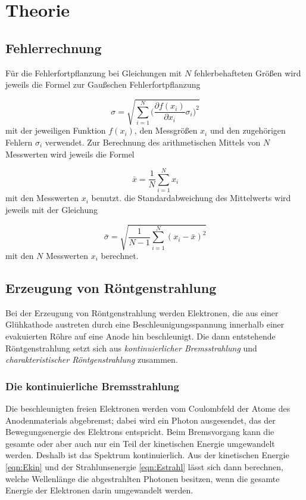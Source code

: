 \section{Theorie}
\label{sec:Theorie}

\subsection{Fehlerrechnung}

Für die Fehlerfortpflanzung bei Gleichungen mit $N$ fehlerbehafteten Größen
wird jeweils die Formel zur Gaußschen Fehlerfortpflanzung

\begin{equation}
  \sigma = \sqrt{\sum_{i=1}^{N}\biggl(\frac{\partial f(x_i)}{\partial x_i}
  \sigma_i\biggr)^2}
\end{equation}
mit der jeweiligen Funktion $f(x_i)$, den Messgrößen $x_i$ und den
zugehörigen Fehlern $\sigma_i$ verwendet.
Zur Berechnung des arithmetischen Mittels von $N$ Messwerten wird jeweils die
Formel

\begin{equation}
  \bar{x} = \frac{1}{N}\sum_{i=1}^{N}x_i
\end{equation}
mit den Messwerten $x_i$ benutzt.
die Standardabweichung des Mittelwerts wird jeweils mit der Gleichung

\begin{equation}
  \bar{\sigma} = \sqrt{\frac{1}{N-1}\sum_{i=1}^{N}(x_i - \bar{x})^2}
\end{equation}
mit den $N$ Messwerten $x_i$ berechnet.

\subsection{Erzeugung von Röntgenstrahlung}

Bei der Erzeugung von Röntgenstrahlung werden Elektronen, die aus einer Glühkathode
austreten durch eine Beschleunigungsspannung innerhalb einer evakuierten Röhre
auf eine Anode  hin beschleunigt. Die dann entstehende Röntgenstrahlung setzt sich
aus \emph{kontinuierlicher Bremsstrahlung} und \emph{charakteristischer Röntgenstrahlung}
zusammen.

\subsubsection{Die kontinuierliche Bremsstrahlung}

Die beschleunigten freien Elektronen werden vom Coulombfeld der Atome des Anodenmaterials
abgebremst; dabei wird ein Photon ausgesendet, das der Bewegungsenergie des  Elektrons
entspricht. Beim Bremsvorgang kann die gesamte oder aber auch nur ein Teil der
kinetischen Energie umgewandelt werden. Deshalb ist das Spektrum kontinuierlich.
Aus der kinetischen Energie \eqref{eqn:Ekin} und der Strahlunsenergie \eqref{eqn:Estrahl}
lässt sich dann berechnen, welche Wellenlänge die abgestrahlten Photonen besitzen, wenn
die gesamte Energie der Elektronen darin umgewandelt werden.

